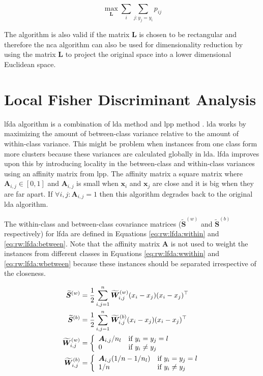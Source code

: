 \documentclass[12pt,a4paper]{report}
\begin{document}
\begin{equation}
\max_{\bm{L}} \sum_i \sum_{j:y_j=y_i} p_{ij} \label{eq:rw:nca:objective}
\end{equation}

The algorithm is also valid if the matrix $\bm{L}$ is chosen to be rectangular and therefore the \ac{nca} algorithm can also be used for dimensionality reduction by using the matrix $\bm{L}$ to project the original space into a lower dimensional Euclidean space.

\section{Local Fisher Discriminant Analysis} \label{chap:rw:lfda}
\acf{lfda} algorithm \citep{sugiyama2007dimensionality} is a combination of \acf{lda} method \citep{fisher1936use} and \acf{lpp} method \citep{he2003locality}. \ac{lda} works by maximizing the amount of between-class variance relative to the amount of within-class variance. This might be problem when instances from one class form more clusters because these variances are calculated globally in \ac{lda}. \ac{lfda} improves upon this by introducing locality in the between-class and within-class variances using an affinity matrix from \ac{lpp}. The affinity matrix a square matrix where $\bm{A}_{i,j} \in [0,1]$ and $\bm{A}_{i,j}$ is small when $\bm{x}_i$ and $\bm{x}_j$ are close and it is big when they are far apart. If $\forall i,j: \bm{A}_{i,j}=1$ then this algorithm degrades back to the original \ac{lda} algorithm.

The within-class and between-class covariance matrices ($\widetilde{\bm{S}}^{(w)}$ and $\widetilde{\bm{S}}^{(b)}$ respectively) for \ac{lfda} are defined in Equations \ref{eq:rw:lfda:within} and \ref{eq:rw:lfda:between}. Note that the affinity matrix $\bm{A}$ is not used to weight the instances from different classes in Equations \ref{eq:rw:lfda:wwithin} and \ref{eq:rw:lfda:wbetween} because these instances should be separated irrespective of the closeness.

\begin{align}
\widetilde{\bm{S}}^{(w)} &= \frac{1}{2} \sum_{i,j=1}^n \widetilde{\bm{W}}_{i,j}^{(w)} (x_i-x_j)(x_i-x_j)^\top \label{eq:rw:lfda:within}
\\
\widetilde{\bm{S}}^{(b)} &= \frac{1}{2} \sum_{i,j=1}^n \widetilde{\bm{W}}_{i,j}^{(b)} (x_i-x_j)(x_i-x_j)^\top \label{eq:rw:lfda:between}
\\
\widetilde{\bm{W}}_{i,j}^{(w)} &= \left\{ \begin{array}{ll} \bm{A}_{i,j}/n_l & \mbox{if } y_i=y_j=l \\ 0 & \mbox{if } y_i \neq y_j \end{array} \right. \label{eq:rw:lfda:wwithin}
\\
\widetilde{\bm{W}}_{i,j}^{(b)} &= \left\{ \begin{array}{ll} \bm{A}_{i,j}(1/n-1/n_l) & \mbox{if } y_i=y_j=l \\ 1/n & \mbox{if } y_i \neq y_j \end{array} \right. \label{eq:rw:lfda:wbetween}
\end{align}
\end{document}
